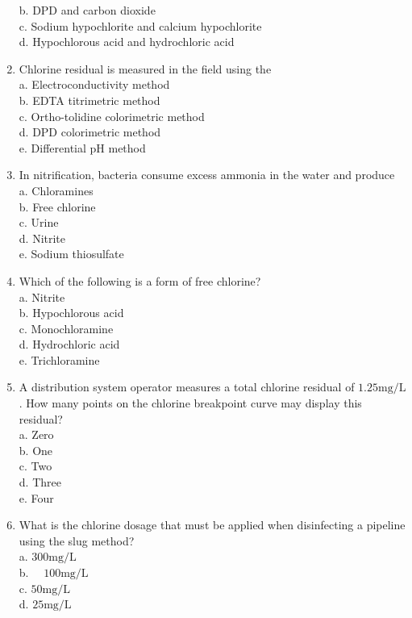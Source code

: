 \begin{enumerate}[1.]
b. DPD and carbon dioxide\\
c. Sodium hypochlorite and calcium hypochlorite\\
d. Hypochlorous acid and hydrochloric acid\\
\item Chlorine residual is measured in the field using the\\
a. Electroconductivity method\\
b. EDTA titrimetric method\\
c. Ortho-tolidine colorimetric method\\
d. DPD colorimetric method\\
e. Differential $\mathrm{pH}$ method\\
\item In nitrification, bacteria consume excess ammonia in the water and produce\\
a. Chloramines\\
b. Free chlorine\\
c. Urine\\
d. Nitrite\\
e. Sodium thiosulfate\\
\item Which of the following is a form of free chlorine?\\
a. Nitrite\\
b. Hypochlorous acid\\
c. Monochloramine\\
d. Hydrochloric acid\\
e. Trichloramine\\
\item A distribution system operator measures a total chlorine residual of $1.25 \mathrm{mg} / \mathrm{L}$. How many points on the chlorine breakpoint curve may display this residual?\\
a. Zero\\
b. One\\
c. Two\\
d. Three\\
e. Four\\
\item What is the chlorine dosage that must be applied when disinfecting a pipeline using the slug method?\\
a. $300 \mathrm{mg} / \mathrm{L}$\\
b. $\quad 100 \mathrm{mg} / \mathrm{L}$\\
c. $50 \mathrm{mg} / \mathrm{L}$\\
d. $25 \mathrm{mg} / \mathrm{L}$\\

\end{enumerate}
